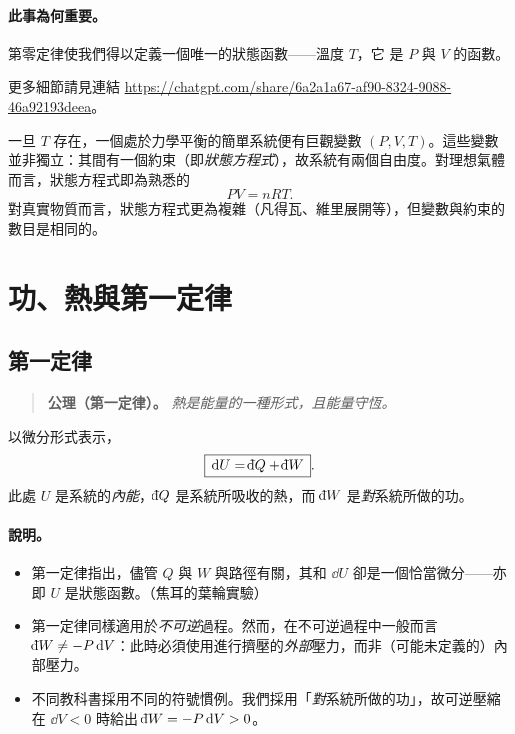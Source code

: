 \paragraph{此事為何重要。}
第零定律使我們得以定義一個唯一的狀態函數——溫度 $T$，它
是 $P$ 與 $V$ 的函數。

更多細節請見連結 \url{https://chatgpt.com/share/6a2a1a67-af90-8324-9088-46a92193deea}。

一旦 $T$ 存在，一個處於力學平衡的簡單系統便有巨觀變數 $(P,V,T)$。這些變數並非獨立：其間有一個約束（即\emph{狀態方程式}），故系統有兩個自由度。對理想氣體而言，狀態方程式即為熟悉的
\[
    PV = nRT.
\]
對真實物質而言，狀態方程式更為複雜（凡得瓦、維里展開等），但變數與約束的數目是相同的。

\section{功、熱與第一定律}

\subsection{第一定律}

\begin{quote}
\textbf{公理（第一定律）。} \textit{熱是能量的一種形式，且能量守恆。}
\end{quote}
以微分形式表示，
\[
    \boxed{\,\dd U = \dbar Q + \dbar W\,}.
\]
此處 $U$ 是系統的\emph{內能}，$\dbar Q$ 是系統所吸收的熱，而 $\dbar W$ 是\emph{對}系統所做的功。
\paragraph{說明。}
\begin{itemize}
    \item 第一定律指出，儘管 $Q$ 與 $W$ 與路徑有關，其和 $\dd U$ 卻是一個恰當微分——亦即 $U$ 是狀態函數。（焦耳的葉輪實驗）
    \item 第一定律同樣適用於\emph{不可逆}過程。然而，在不可逆過程中一般而言 $\dbar W \neq -P\,\dd V$：此時必須使用進行擠壓的\emph{外部}壓力，而非（可能未定義的）內部壓力。
    \item 不同教科書採用不同的符號慣例。我們採用「\emph{對}系統所做的功」，故可逆壓縮在 $\dd V < 0$ 時給出 $\dbar W = -P\,\dd V > 0$。
\end{itemize}

